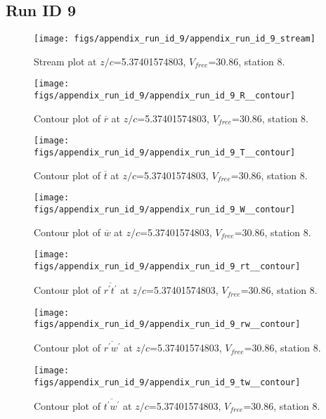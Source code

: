 \subsection{Run ID 9}
\begin{figure}[H]
\centering
\texttt{[image: figs/appendix\_run\_id\_9/appendix\_run\_id\_9\_stream]}
\caption{Stream plot at $z/c$=5.37401574803, $V_{free}$=30.86, station 8.}
\label{fig:appendix_run_id_9_stream}
\end{figure}


\begin{figure}[H]
\centering
\texttt{[image: figs/appendix\_run\_id\_9/appendix\_run\_id\_9\_R\_\_contour]}
\caption{Contour plot of $\overline{r}$ at $z/c$=5.37401574803, $V_{free}$=30.86, station 8.}
\label{fig:appendix_run_id_9_R__contour}
\end{figure}


\begin{figure}[H]
\centering
\texttt{[image: figs/appendix\_run\_id\_9/appendix\_run\_id\_9\_T\_\_contour]}
\caption{Contour plot of $\overline{t}$ at $z/c$=5.37401574803, $V_{free}$=30.86, station 8.}
\label{fig:appendix_run_id_9_T__contour}
\end{figure}


\begin{figure}[H]
\centering
\texttt{[image: figs/appendix\_run\_id\_9/appendix\_run\_id\_9\_W\_\_contour]}
\caption{Contour plot of $\overline{w}$ at $z/c$=5.37401574803, $V_{free}$=30.86, station 8.}
\label{fig:appendix_run_id_9_W__contour}
\end{figure}


\begin{figure}[H]
\centering
\texttt{[image: figs/appendix\_run\_id\_9/appendix\_run\_id\_9\_rt\_\_contour]}
\caption{Contour plot of $\overline{r^\prime t^\prime}$ at $z/c$=5.37401574803, $V_{free}$=30.86, station 8.}
\label{fig:appendix_run_id_9_rt__contour}
\end{figure}


\begin{figure}[H]
\centering
\texttt{[image: figs/appendix\_run\_id\_9/appendix\_run\_id\_9\_rw\_\_contour]}
\caption{Contour plot of $\overline{r^\prime w^\prime}$ at $z/c$=5.37401574803, $V_{free}$=30.86, station 8.}
\label{fig:appendix_run_id_9_rw__contour}
\end{figure}


\begin{figure}[H]
\centering
\texttt{[image: figs/appendix\_run\_id\_9/appendix\_run\_id\_9\_tw\_\_contour]}
\caption{Contour plot of $\overline{t^\prime w^\prime}$ at $z/c$=5.37401574803, $V_{free}$=30.86, station 8.}
\label{fig:appendix_run_id_9_tw__contour}
\end{figure}


